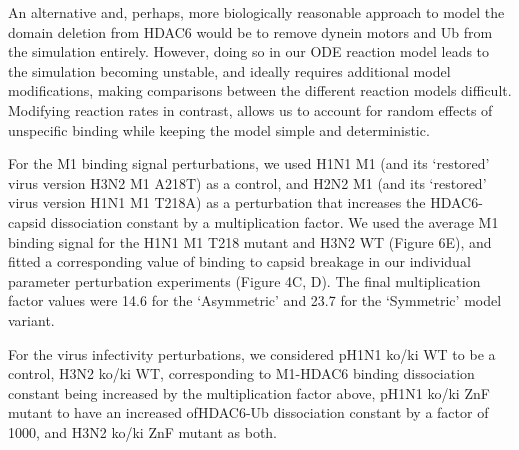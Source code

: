 An alternative and, perhaps, more biologically reasonable approach to model the domain deletion from HDAC6 would be to remove dynein motors and Ub from the simulation entirely. However, doing so in our ODE reaction model leads to the simulation becoming unstable, and ideally requires additional model modifications, making comparisons between the different reaction models difficult. Modifying reaction rates in contrast, allows us to account for random effects of unspecific binding while keeping the model simple and deterministic.

For the M1 binding signal perturbations, we used H1N1 M1 (and its ‘restored’ virus version H3N2 M1 A218T) as a control, and H2N2 M1 (and its ‘restored’ virus version H1N1 M1 T218A) as a perturbation that increases the HDAC6-capsid dissociation constant by a multiplication factor. We used the average M1 binding signal for the H1N1 M1 T218 mutant and H3N2 WT (Figure 6E), and fitted a corresponding value of binding to capsid breakage in our individual parameter perturbation experiments (Figure 4C, D). The final multiplication factor values were 14.6 for the ‘Asymmetric’ and 23.7 for the ‘Symmetric’ model variant.

For the virus infectivity perturbations, we considered pH1N1 ko/ki WT to be a control, H3N2 ko/ki WT, corresponding to M1-HDAC6 binding dissociation constant being increased by the multiplication factor above, pH1N1 ko/ki ZnF mutant to have an increased ofHDAC6-Ub dissociation constant by a factor of 1000, and H3N2 ko/ki ZnF mutant as both.

